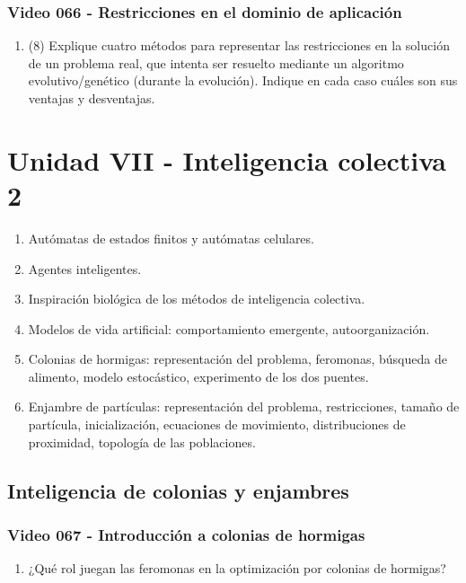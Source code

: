 \documentclass[a4paper,10pt,spanish]{article}
\begin{document}
\subsubsection{Video 066 - Restricciones en el dominio de aplicación}

\begin{enumerate}
\item (8) Explique cuatro métodos para representar las restricciones en la solución de un problema real, que intenta ser resuelto mediante un algoritmo evolutivo/genético (durante la evolución). Indique en cada caso cuáles son sus ventajas y desventajas.
\end{enumerate}

\newpage

\section{Unidad VII - Inteligencia colectiva 2}

\begin{enumerate}
\item Autómatas de estados finitos y autómatas celulares.
\item Agentes inteligentes.
\item Inspiración biológica de los métodos de inteligencia colectiva.
\item Modelos de vida artificial: comportamiento emergente, autoorganización.
\item Colonias de hormigas: representación del problema, feromonas, búsqueda de alimento, modelo estocástico, experimento de los dos puentes.
\item Enjambre de partículas: representación del problema, restricciones, tamaño de partícula, inicialización, ecuaciones de movimiento, distribuciones de proximidad, topología de las poblaciones.
\end{enumerate}

\subsection{Inteligencia de colonias y enjambres}

\subsubsection{Video 067 - Introducción a colonias de hormigas}

\begin{enumerate}
\item ¿Qué rol juegan las feromonas en la optimización por colonias de hormigas?
\end{enumerate}
\end{document}

